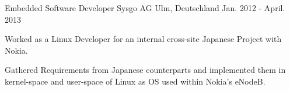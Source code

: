   \cventry
    {Embedded Software Developer} %
    {Sysgo AG} %
    {Ulm, Deutschland} %
    {Jan. 2012 - April. 2013} %
    {
      \begin{cvitems} %
    \item {Worked as a Linux Developer for an internal cross-site Japanese Project with Nokia.}
	\item {Gathered Requirements from Japanese counterparts and implemented them in kernel-space and user-space of Linux as OS used within Nokia's eNodeB.}
       \end{cvitems}
    }
